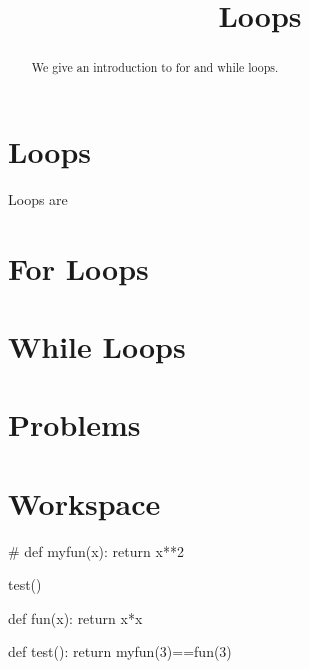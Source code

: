 \documentclass{ximera}
\title{Loops}
\begin{document}
  
\begin{abstract}  
We give an introduction to for and while loops.
\end{abstract}  
\maketitle

\section{Loops}

Loops are 

\section{For Loops}

\section{While Loops}

\section{Problems}

\begin{question}
\end{question}

\begin{question}
\end{question}

\section{Workspace}


\begin{sageCell}
#
def myfun(x):
        return x**2

test()
\end{sageCell}

\begin{expandable}
\begin{sageOutput}
def fun(x):
        return x*x

def test():
	return myfun(3)==fun(3)
\end{sageOutput}
\end{expandable}
\end{document}
